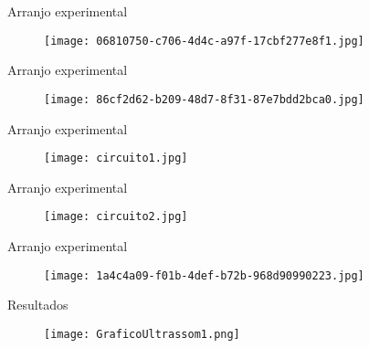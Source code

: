 \documentclass{beamer}
\begin{document}
\begin{frame}{Arranjo experimental}

    \begin{figure}
  \texttt{[image: 06810750-c706-4d4c-a97f-17cbf277e8f1.jpg]}
\end{figure}

\end{frame}

\begin{frame}{Arranjo experimental}
    \begin{figure}
  \texttt{[image: 86cf2d62-b209-48d7-8f31-87e7bdd2bca0.jpg]}
\end{figure}
    
\end{frame}

\begin{frame}{Arranjo experimental}

    \begin{figure}
  \texttt{[image: circuito1.jpg]}
  
\end{figure}

    
\end{frame}

\begin{frame}{Arranjo experimental}

    \begin{figure}
  \texttt{[image: circuito2.jpg]}
  
\end{figure}

    
\end{frame}

\begin{frame}{Arranjo experimental}

    \begin{figure}
  \texttt{[image: 1a4c4a09-f01b-4def-b72b-968d90990223.jpg]}
  
\end{figure}

    
\end{frame}

\begin{frame}{Resultados}
    
     \begin{figure}
  \texttt{[image: GraficoUltrassom1.png]}
\end{figure}
    
\end{frame}
\end{document}
